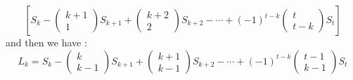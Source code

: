 \documentclass{article}
\begin{document}
$$
\left[
S_{k}
-
\left(\begin{array}{c}
k+1\\
1
\end{array}\right)
S_{k+1}
+
\left(\begin{array}{c}
k+2\\
2
\end{array}\right)
S_{k+2}
-
\cdots
+
(-1)^{t-k}
\left(\begin{array}{c}
t\\
t-k
\end{array}\right)
S_t
\right]
$$
and then we have :
$$
L_k
=
S_k
-
\left(\begin{array}{c}
k\\
k-1
\end{array}\right)
S_{k+1}
+
\left(\begin{array}{c}
k+1\\
k-1
\end{array}\right)
S_{k+2}
-
\cdots
+
(-1)^{t-k}
\left(\begin{array}{c}
t-1\\
k-1
\end{array}\right)
S_t
$$
\end{document}
